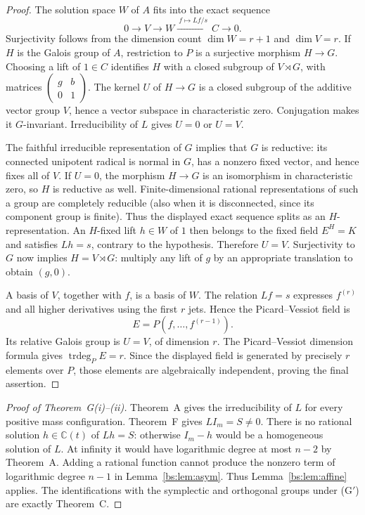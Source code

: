 \documentclass[11pt,a4paper]{article}
\theoremstyle{definition}
\theoremstyle{remark}
\numberwithin{equation}{section}
\newcommand{\C}{\mathbb{C}}
\DeclareMathOperator{\trdeg}{trdeg}
\begin{document}
\begin{proof}
The solution space $W$ of $A$ fits into the exact sequence
\[
0\longrightarrow V\longrightarrow W
 \xrightarrow{\ f\mapsto Lf/s\ } C\longrightarrow0.
\]
Surjectivity follows from the dimension count $\dim W=r+1$ and $\dim V=r$. If $H$ is the Galois group of $A$, restriction to $P$ is a surjective morphism $H\to G$. Choosing a lift of $1\in C$ identifies $H$ with a closed subgroup of $V\rtimes G$, with matrices $\left(\begin{smallmatrix}g&b\\0&1\end{smallmatrix}\right)$. The kernel $U$ of $H\to G$ is a closed subgroup of the additive vector group $V$, hence a vector subspace in characteristic zero. Conjugation makes it $G$-invariant. Irreducibility of $L$ gives $U=0$ or $U=V$.

The faithful irreducible representation of $G$ implies that $G$ is reductive: its connected unipotent radical is normal in $G$, has a nonzero fixed vector, and hence fixes all of $V$. If $U=0$, the morphism $H\to G$ is an isomorphism in characteristic zero, so $H$ is reductive as well. Finite-dimensional rational representations of such a group are completely reducible (also when it is disconnected, since its component group is finite). Thus the displayed exact sequence splits as an $H$-representation. An $H$-fixed lift $h\in W$ of $1$ then belongs to the fixed field $E^H=K$ and satisfies $Lh=s$, contrary to the hypothesis. Therefore $U=V$. Surjectivity to $G$ now implies $H=V\rtimes G$: multiply any lift of $g$ by an appropriate translation to obtain $(g,0)$.

A basis of $V$, together with $f$, is a basis of $W$. The relation $Lf=s$ expresses $f^{(r)}$ and all higher derivatives using the first $r$ jets. Hence the Picard--Vessiot field is
\[
E=P(f,\ldots,f^{(r-1)}).
\] Its relative Galois group is $U=V$, of dimension $r$. The Picard--Vessiot dimension formula gives $\trdeg_P E=r$. Since the displayed field is generated by precisely $r$ elements over $P$, those elements are algebraically independent, proving the final assertion.
\end{proof}

\begin{proof}[Proof of Theorem~G(i)--(ii)]
Theorem~A gives the irreducibility of $L$ for every positive mass configuration. Theorem~F gives $LI_m=S\ne0$. There is no rational solution $h\in\C(t)$ of $Lh=S$: otherwise $I_m-h$ would be a homogeneous solution of $L$. At infinity it would have logarithmic degree at most $n-2$ by Theorem~A. Adding a rational function cannot produce the nonzero term of logarithmic degree $n-1$ in Lemma~\ref{bs:lem:asym}. Thus Lemma~\ref{bs:lem:affine} applies. The identifications with the symplectic and orthogonal groups under {\rm(G$'$)} are exactly Theorem~C.
\end{proof}
\end{document}
